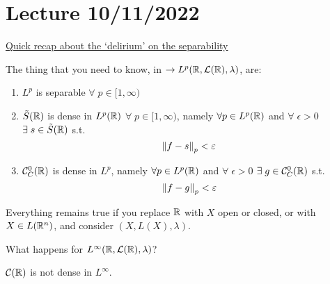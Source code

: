 \section{Lecture 10/11/2022}
\noindent\underline{Quick recap about the `delirium' on the separability}

The thing that you need to know, in \(\to L^p(\mathbb{R}, \mathcal{L}(\mathbb{R}), \lambda)\), are:
\begin{enumerate}
    \item \(L^p\) is separable \(\forall\; p \in [1, \infty)\)
    \item \(\tilde{S}(\mathbb{R})\) is dense in \(L^p(\mathbb{R})\) \(\forall \; p \in [1, \infty)\), 
    namely \(\forall p \in L^p (\mathbb{R})\) and \(\forall \; \epsilon >0 \) \(\exists \; s \in \tilde{S}(\mathbb{R})\) s.t. 
    \[
        \norm{f-s}_p < \varepsilon
    \]
    \item \(\mathcal{C}_C^0 (\mathbb{R})\) is dense in \(L^p\), namely \(\forall p \in L^p (\mathbb{R})\) and \(\forall \; \epsilon >0 \) \(\exists \; g \in \mathcal{C}_C^0(\mathbb{R})\) s.t. 
    \[
        \norm{f-g}_p < \varepsilon
    \]
\end{enumerate}
Everything remains true if you replace \(\mathbb{R}\) with \(X\) open or closed, or with \(X \in L(\mathbb{R}^n)\), and consider \((X, L(X), \lambda)\).

What happens for \(L^{\infty}(\mathbb{R}, \mathcal{L}(\mathbb{R}), \lambda)\)? 

\(\mathcal{C}(\mathbb{R})\) is not dense in \(L^\infty\).

